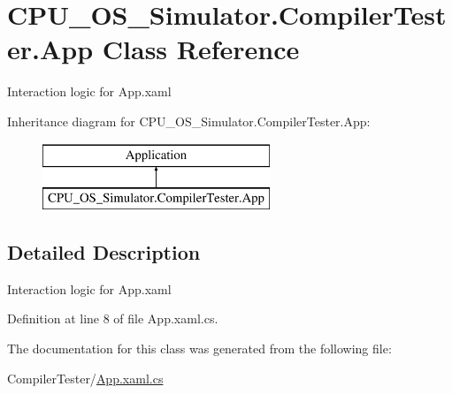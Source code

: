 \hypertarget{class_c_p_u___o_s___simulator_1_1_compiler_tester_1_1_app}{}\section{C\+P\+U\+\_\+\+O\+S\+\_\+\+Simulator.\+Compiler\+Tester.\+App Class Reference}
\label{class_c_p_u___o_s___simulator_1_1_compiler_tester_1_1_app}


Interaction logic for App.\+xaml  


Inheritance diagram for C\+P\+U\+\_\+\+O\+S\+\_\+\+Simulator.\+Compiler\+Tester.\+App\+:\begin{figure}[H]
\begin{center}
\leavevmode
\includegraphics[height=2.000000cm]{class_c_p_u___o_s___simulator_1_1_compiler_tester_1_1_app}
\end{center}
\end{figure}


\subsection{Detailed Description}
Interaction logic for App.\+xaml 



Definition at line 8 of file App.\+xaml.\+cs.



The documentation for this class was generated from the following file\+:\begin{DoxyCompactItemize}
\item 
Compiler\+Tester/\hyperlink{_compiler_tester_2_app_8xaml_8cs}{App.\+xaml.\+cs}\end{DoxyCompactItemize}
